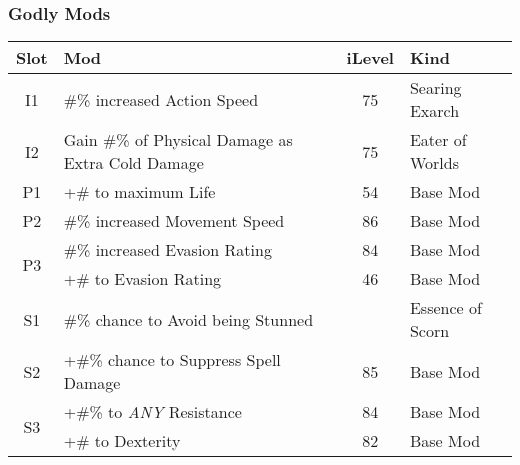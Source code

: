 \subsubsection{Godly Mods}
\begin{tabular}{|c|l|c|l|}
	\hline
	Slot&Mod&iLevel&Kind\\\hline
	I1& \#\% increased Action Speed&75& Searing Exarch \\\hline
	I2& Gain \#\% of Physical Damage as Extra Cold Damage&75& Eater of Worlds \\\hline\hline
	P1& +\# to maximum Life&54& Base Mod \\\hline
	P2& \#\% increased Movement Speed&86& Base Mod \\\hline
	\multirow{2}{*}{P3}& \#\% increased Evasion Rating&84& Base Mod \\\cline{2-4}
	& +\# to Evasion Rating&46& Base Mod \\\hline\hline
	S1&\#\% chance to Avoid being Stunned&&Essence of Scorn \\\hline
	S2&+\#\% chance to Suppress Spell Damage&85&Base Mod \\\hline
	\multirow{2}{*}{S3}&+\#\% to \emph{ANY} Resistance&84&Base Mod \\\cline{2-4}
	&+\# to Dexterity&82&Base Mod \\\hline
\end{tabular}


